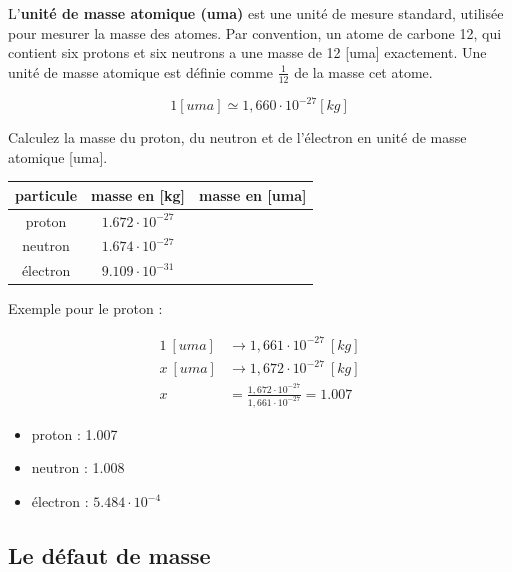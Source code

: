 \documentclass[
  11pt,
  a4paper,
  openany]{book}
\providecommand{\tightlist}{%
  \setlength{\itemsep}{0pt}\setlength{\parskip}{0pt}}
\begin{document}
L'\textbf{unité de masse atomique (uma)} est une unité de mesure standard, utilisée pour mesurer la masse des atomes. Par convention, un atome de carbone 12, qui contient six protons et six neutrons a une masse de 12 {[}uma{]} exactement. Une unité de masse atomique est définie comme \(\frac{1}{12}\) de la masse cet atome.

\[ 1 [uma] \simeq 1,660 \cdot 10^{-27} [kg] \]

\begin{Exercise}
Calculez la masse du proton, du neutron et de l'électron en unité de masse atomique {[}uma{]}.

\end{Exercise}

\begin{longtable}[]{@{}ccc@{}}
\toprule\noalign{}
particule & masse en {[}kg{]} & masse en {[}uma{]} \\
\midrule\noalign{}
\endhead
\bottomrule\noalign{}
\endlastfoot
proton & \(1.672\cdot10^{-27}\) & \\
neutron & \(1.674\cdot10^{-27}\) & \\
électron & \(9.109\cdot10^{-31}\) & \\
\end{longtable}


\begin{Answer}

Exemple pour le proton :

\[ \begin{split}
  1~[uma] &\rightarrow 1,661\cdot10^{-27}~[kg] \\
  x~[uma] &\rightarrow 1,672\cdot10^{-27}~[kg] \\
  x &= \frac{1,672\cdot10^{-27}}{1,661\cdot10^{-27}} = 1.007
  \end{split} \]

\begin{itemize}
\tightlist
\item
  proton : 1.007
\item
  neutron : 1.008
\item
  électron : \(5.484\cdot10^{-4}\)
\end{itemize}

\end{Answer}

\subsection{Le défaut de masse}\label{le-duxe9faut-de-masse}
\end{document}
